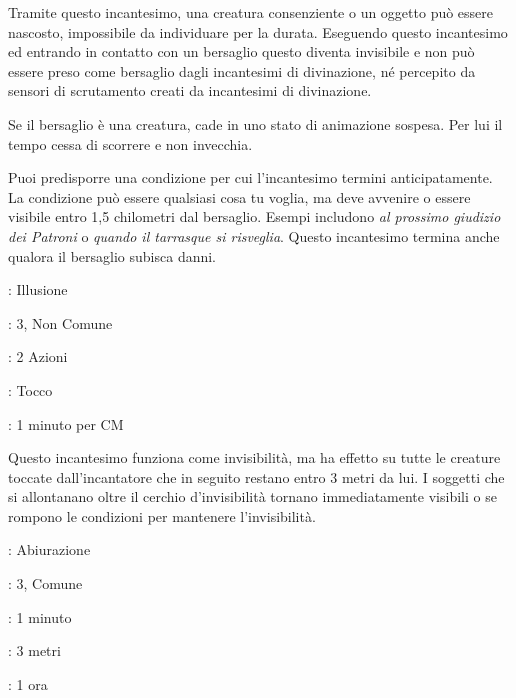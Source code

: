 \begin{multicols}{2}
Tramite questo incantesimo, una creatura consenziente o un oggetto può essere nascosto, impossibile da individuare per la durata. Eseguendo questo incantesimo ed entrando in contatto con un bersaglio questo diventa invisibile e non può essere preso come bersaglio dagli incantesimi di divinazione, né percepito da sensori di scrutamento creati da incantesimi di divinazione.

Se il bersaglio è una creatura, cade in uno stato di animazione sospesa. Per lui il tempo cessa di scorrere e non invecchia.

Puoi predisporre una condizione per cui l'incantesimo termini anticipatamente. La condizione può essere qualsiasi cosa tu voglia, ma deve avvenire o essere visibile entro 1,5 chilometri dal bersaglio. Esempi includono \emph{al prossimo giudizio dei Patroni} o \emph{quando il tarrasque si risveglia}. Questo incantesimo termina anche qualora il bersaglio subisca danni.

\noindent\colorbox{OBSSgold!10}{
\begin{minipage}{0.95\linewidth}
\begin{description}[noitemsep, topsep=0pt, parsep=0pt, partopsep=0pt, leftmargin=0cm, labelwidth=1.3cm]
	\item[\textbf{Lista}]: Illusione
	\item[\textbf{Livello}]: 3, Non Comune
	\item[\textbf{Lancio}]: 2 Azioni
	\item[\textbf{Gittata}]: Tocco
	\item[\textbf{Durata}]: 1 minuto per CM
\end{description}
\end{minipage}}\smallskip

Questo incantesimo funziona come invisibilità, ma ha effetto su tutte le creature toccate dall'incantatore che in seguito restano entro 3 metri da lui. I soggetti che si allontanano oltre il cerchio d'invisibilità tornano immediatamente visibili o se rompono le condizioni per mantenere l'invisibilità.


\noindent\colorbox{OBSSgold!10}{
\begin{minipage}{0.95\linewidth}
\begin{description}[noitemsep, topsep=0pt, parsep=0pt, partopsep=0pt, leftmargin=0cm, labelwidth=1.3cm]
	\item[\textbf{Lista}]: Abiurazione
	\item[\textbf{Livello}]: 3, Comune
	\item[\textbf{Lancio}]: 1 minuto
	\item[\textbf{Gittata}]: 3 metri
	\item[\textbf{Durata}]: 1 ora
\end{description}
\end{minipage}}\smallskip


\end{multicols}
